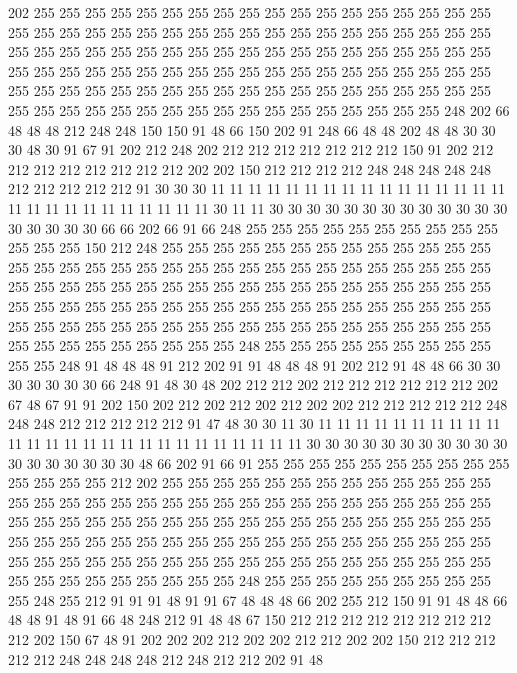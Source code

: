202 255 255 255 255 255 255 255 255 255 255 255 255 255 255 255 255 255 255 255
255 255 255 255 255 255 255 255 255 255 255 255 255 255 255 255 255 255 255 255
255 255 255 255 255 255 255 255 255 255 255 255 255 255 255 255 255 255 255 255
255 255 255 255 255 255 255 255 255 255 255 255 255 255 255 255 255 255 255 255
255 255 255 255 255 255 255 255 255 255 255 255 255 255 255 255 255 255 255 255
255 255 255 255 255 255 255 255 255 255 255 255 248 202 66 48 48 48 212 248
248 150 150 91 48 66 150 202 91 248 66 48 48 202 48 48 30 30 30 48
30 91 67 91 202 212 248 202 212 212 212 212 212 212 212 150 91 202 212 212
212 212 212 212 212 212 202 202 150 212 212 212 212 248 248 248 248 248 212 212
212 212 212 91 30 30 30 11 11 11 11 11 11 11 11 11 11 11 11 11
11 11 11 11 11 11 11 11 11 11 11 11 11 11 30 11 11 30 30 30
30 30 30 30 30 30 30 30 30 30 30 30 30 30 30 66 66 202 66 91
66 248 255 255 255 255 255 255 255 255 255 255 255 255 255 150 212 248 255 255
255 255 255 255 255 255 255 255 255 255 255 255 255 255 255 255 255 255 255 255
255 255 255 255 255 255 255 255 255 255 255 255 255 255 255 255 255 255 255 255
255 255 255 255 255 255 255 255 255 255 255 255 255 255 255 255 255 255 255 255
255 255 255 255 255 255 255 255 255 255 255 255 255 255 255 255 255 255 255 255
255 255 255 255 255 255 255 255 255 255 255 255 255 255 255 255 248 255 255 255
255 255 255 255 255 255 255 255 248 91 48 48 48 91 212 202 91 91 48 48
48 91 202 212 91 48 48 66 30 30 30 30 30 30 30 66 248 91 48 30
48 202 212 212 202 212 212 212 212 212 212 202 67 48 67 91 91 202 150 202
212 202 212 202 212 202 202 212 212 212 212 212 248 248 248 212 212 212 212 212
91 47 48 30 30 11 30 11 11 11 11 11 11 11 11 11 11 11 11 11
11 11 11 11 11 11 11 11 11 11 11 11 11 30 30 30 30 30 30 30
30 30 30 30 30 30 30 30 30 30 30 48 66 202 91 66 91 255 255 255
255 255 255 255 255 255 255 255 255 255 255 212 202 255 255 255 255 255 255 255
255 255 255 255 255 255 255 255 255 255 255 255 255 255 255 255 255 255 255 255
255 255 255 255 255 255 255 255 255 255 255 255 255 255 255 255 255 255 255 255
255 255 255 255 255 255 255 255 255 255 255 255 255 255 255 255 255 255 255 255
255 255 255 255 255 255 255 255 255 255 255 255 255 255 255 255 255 255 255 255
255 255 255 255 255 255 255 255 255 255 255 248 255 255 255 255 255 255 255 255
255 255 248 255 212 91 91 91 48 91 91 67 48 48 48 66 202 255 212 150
91 91 48 48 66 48 48 91 48 91 66 48 248 212 91 48 48 67 150 212
212 212 212 212 212 212 212 212 202 150 67 48 91 202 202 202 212 202 202 212
212 202 202 150 212 212 212 212 212 248 248 248 248 212 248 212 212 202 91 48
